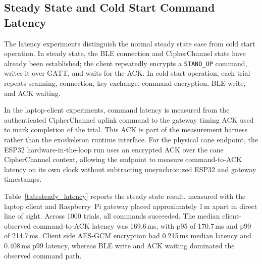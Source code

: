 \documentclass[journal]{IEEEtran}
\begin{document}
\subsection{Steady State and Cold Start Command Latency}

The latency experiments distinguish the normal steady state case from cold start operation. In steady state, the BLE connection and CipherChannel state have already been established; the client repeatedly encrypts a \texttt{STAND\_UP} command, writes it over GATT, and waits for the ACK. In cold start operation, each trial repeats scanning, connection, key exchange, command encryption, BLE write, and ACK waiting.

In the laptop-client experiments, command latency is measured from the authenticated CipherChannel uplink command to the gateway timing ACK used to mark completion of the trial. This ACK is part of the measurement harness rather than the exoskeleton runtime interface. For the physical cane endpoint, the ESP32 hardware-in-the-loop run uses an encrypted ACK over the cane CipherChannel context, allowing the endpoint to measure command-to-ACK latency on its own clock without subtracting unsynchronized ESP32 and gateway timestamps.


Table~\ref{tab:steady_latency} reports the steady state result, measured with the laptop client and Raspberry~Pi gateway placed approximately 1\,m apart in direct line of sight. Across 1000 trials, all commands succeeded. The median client-observed command-to-ACK latency was 169.6\,ms, with p95 of 170.7\,ms and p99 of 214.7\,ms. Client side AES-GCM encryption had 0.215\,ms  median latency and 0.408\,ms  p99 latency, whereas BLE write and ACK waiting dominated the observed command path.

\begin{table}[!t]
\renewcommand{\arraystretch}{1.15}
\setlength{\tabcolsep}{4pt}
\caption{Steady State Secure Command Write and Timing-ACK Latency for \texttt{STAND\_UP} (ms, $N=1000$)}
\label{tab:steady_latency}
\centering
{}
\end{table}
\end{document}
